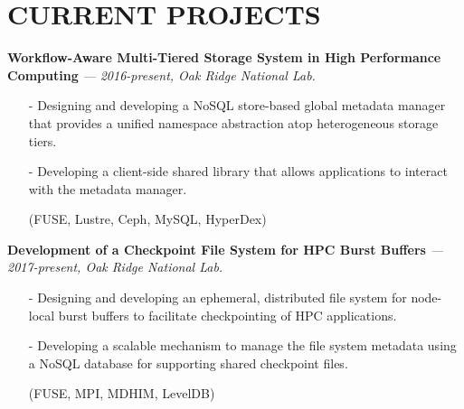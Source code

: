 \section{CURRENT PROJECTS}
\vspace{.03in}
  {\bf Workflow-Aware Multi-Tiered Storage System in High Performance Computing}
   {\it \footnotesize --- 2016-present, Oak Ridge National Lab.}
   \begin{itemize}[leftmargin=*]
    \setlength\itemsep{-0.02in}
    \item[-] Designing and developing a NoSQL store-based global metadata manager
	     that provides a unified namespace abstraction atop heterogeneous
	     storage tiers.
    \item[-] Developing a client-side shared library that allows applications to interact
             with the metadata manager.
    \item[] {\small(FUSE, Lustre, Ceph, MySQL, HyperDex)}
   \end{itemize}
  \vspace{-0.15in}
  {\bf Development of a Checkpoint File System for HPC Burst Buffers}
   {\it \footnotesize --- 2017-present, Oak Ridge National Lab.}
   \begin{itemize}[leftmargin=*]
    \setlength\itemsep{-0.02in}
    \item[-] Designing and developing an ephemeral, distributed file system for
	     node-local burst buffers to facilitate checkpointing of HPC applications.
    \item[-] Developing a scalable mechanism to manage the file system metadata
             using a NoSQL database for supporting shared checkpoint files.
    \item[] {\small(FUSE, MPI, MDHIM, LevelDB)}
   \end{itemize}
